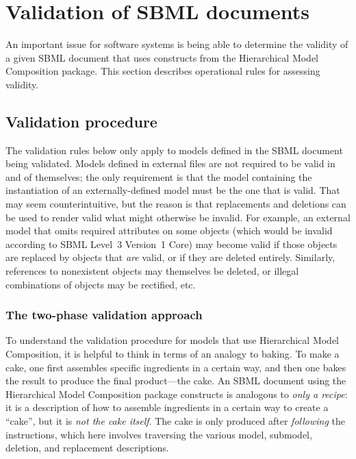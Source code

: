 
\section{Validation of SBML documents}
\label{apdx-validation}

An important issue for software systems is being able to determine the
validity of a given SBML document that uses constructs from the
Hierarchical Model Composition package.  This section describes
operational rules for assessing validity.  


\subsection{Validation procedure}
\label{validation-procedure}

The validation rules below only apply to models defined in the SBML
document being validated.  Models defined in external files are not
required to be valid in and of themselves; the only requirement is that
the model containing the instantiation of an externally-defined model
must be the one that is valid.  That may seem counterintuitive, but the
reason is that replacements and deletions can be used to render valid
what might otherwise be invalid.  For example, an external model that
omits required attributes on some objects (which would be invalid
according to SBML Level~3 Version~1 Core) may become valid if those
objects are replaced by objects that \emph{are} valid, or if they are
deleted entirely.  Similarly, references to nonexistent objects may
themselves be deleted, or illegal combinations of objects may be
rectified, etc.


\subsubsection{The two-phase validation approach}

To understand the validation procedure for models that use Hierarchical
Model Composition, it is helpful to think in terms of an analogy to
baking.  To make a cake, one first assembles specific ingredients in a
certain way, and then one bakes the result to produce the final
product---the cake.  An SBML document using the Hierarchical Model
Composition package constructs is analogous to \emph{only a recipe}: it
is a description of how to assemble ingredients in a certain way to
create a ``cake'', but it is \emph{not the cake itself}.  The cake is
only produced after \emph{following} the instructions, which here
involves traversing the various model, submodel, deletion, and
replacement descriptions.

